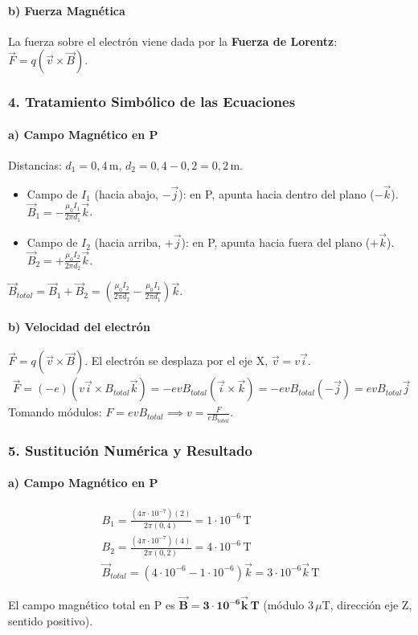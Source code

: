 \paragraph{b) Fuerza Magnética}
La fuerza sobre el electrón viene dada por la \textbf{Fuerza de Lorentz}: $\vec{F} = q(\vec{v} \times \vec{B})$.
\subsubsection*{4. Tratamiento Simbólico de las Ecuaciones}
\paragraph{a) Campo Magnético en P}
Distancias: $d_1 = 0,4\,\text{m}$, $d_2 = 0,4-0,2=0,2\,\text{m}$.
\begin{itemize}
    \item Campo de $I_1$ (hacia abajo, $-\vec{j}$): en P, apunta hacia dentro del plano ($-\vec{k}$). $\vec{B}_1 = -\frac{\mu_0 I_1}{2\pi d_1}\vec{k}$.
    \item Campo de $I_2$ (hacia arriba, $+\vec{j}$): en P, apunta hacia fuera del plano ($+\vec{k}$). $\vec{B}_2 = +\frac{\mu_0 I_2}{2\pi d_2}\vec{k}$.
\end{itemize}
$\vec{B}_{total} = \vec{B}_1 + \vec{B}_2 = \left(\frac{\mu_0 I_2}{2\pi d_2} - \frac{\mu_0 I_1}{2\pi d_1}\right)\vec{k}$.
\paragraph{b) Velocidad del electrón}
$\vec{F} = q(\vec{v} \times \vec{B})$. El electrón se desplaza por el eje X, $\vec{v}=v\vec{i}$.
\begin{gather}
    \vec{F} = (-e)(v\vec{i} \times B_{total}\vec{k}) = -evB_{total}(\vec{i}\times\vec{k}) = -evB_{total}(-\vec{j}) = evB_{total}\vec{j}
\end{gather}
Tomando módulos: $F = evB_{total} \implies v = \frac{F}{eB_{total}}$.
\subsubsection*{5. Sustitución Numérica y Resultado}
\paragraph{a) Campo Magnético en P}
\begin{gather}
    B_1 = \frac{(4\pi\cdot10^{-7})(2)}{2\pi(0,4)} = 1\cdot10^{-6}\,\text{T} \\
    B_2 = \frac{(4\pi\cdot10^{-7})(4)}{2\pi(0,2)} = 4\cdot10^{-6}\,\text{T} \\
    \vec{B}_{total} = (4\cdot10^{-6} - 1\cdot10^{-6})\vec{k} = 3\cdot10^{-6}\vec{k}\,\text{T}
\end{gather}
\begin{cajaresultado}
El campo magnético total en P es $\boldsymbol{\vec{B} = 3\cdot10^{-6}\vec{k}\,\textbf{T}}$ (módulo $3\,\mu\text{T}$, dirección eje Z, sentido positivo).
\end{cajaresultado}
